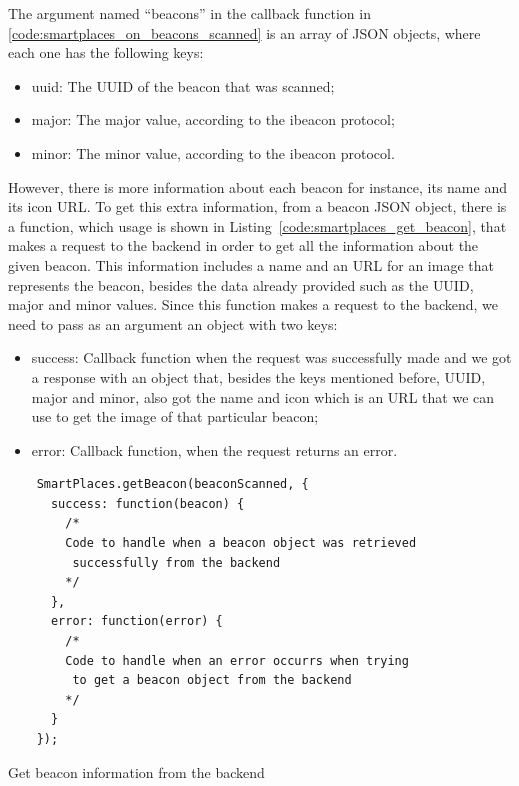 The argument named ``beacons'' in the callback function in \ref{code:smartplaces_on_beacons_scanned} is an array of \gls{JSON} objects, where each one has the following keys:
\begin{itemize}
  \item uuid: The \gls{UUID} of the beacon that was scanned;
  \item major: The major value, according to the ibeacon protocol;
  \item minor: The minor value, according to the ibeacon protocol.
\end{itemize}

However, there is more information about each beacon for instance, its name and its icon \gls{URL}.
To get this extra information, from a beacon \gls{JSON} object, there is a function, which usage is shown in Listing~\ref{code:smartplaces_get_beacon}, that makes a request to the backend in order to get all the information about the given beacon. This information includes a name and an \gls{URL} for an image that represents the beacon, besides the data already provided such as the \gls{UUID}, major and minor values.
Since this function makes a request to the backend, we need to pass as an argument an object with two keys:
\begin{itemize}
  \item success: Callback function when the request was successfully made and we got a response with an object that, besides the keys mentioned before, \gls{UUID}, major and minor, also got the name and icon which is an \gls{URL} that we can use to get the image of that particular beacon;
  \item error: Callback function, when the request returns an error.
\end{itemize}

\begin{listing}[H]
  \begin{verbatim}
    SmartPlaces.getBeacon(beaconScanned, {
      success: function(beacon) {
        /*
        Code to handle when a beacon object was retrieved
         successfully from the backend
        */
      },
      error: function(error) {
        /*
        Code to handle when an error occurrs when trying
         to get a beacon object from the backend
        */
      }
    });
  \end{verbatim}
  \caption[Get beacon object]{Get beacon information from the backend}
  \label{code:smartplaces_get_beacon}
\end{listing}

